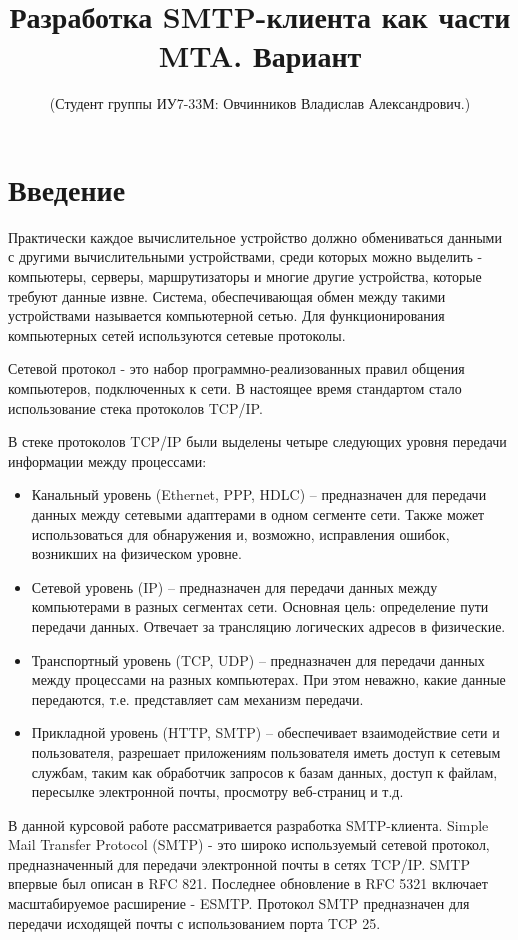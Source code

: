 \documentclass[a4paper,12pt]{report}
\title{Разработка SMTP-клиента как части MTA. Вариант \textnumero 26}
\author{(Студент группы ИУ7-33М: Овчинников Владислав Александрович.)}
\begin{document}
	\maketitle

	\tableofcontents

	\chapter*{Введение}
	Практически каждое вычислительное устройство должно обмениваться данными с другими вычислительными устройствами, среди которых можно выделить - компьютеры, серверы, маршрутизаторы и многие другие устройства, которые требуют данные извне. Система, обеспечивающая обмен между такими устройствами называется компьютерной сетью. Для функционирования компьютерных сетей используются сетевые протоколы.

	Сетевой протокол - это набор программно-реализованных правил общения компьютеров, подключенных к сети. В настоящее время стандартом стало использование стека протоколов TCP/IP.
	
	В стеке протоколов TCP/IP были выделены четыре следующих уровня передачи информации между процессами:
	
	\begin{itemize}
		\item Канальный уровень (Ethernet, PPP, HDLC) -- предназначен для передачи данных между сетевыми адаптерами в одном сегменте сети. Также может использоваться для обнаружения и, возможно, исправления ошибок, возникших на физическом уровне.
		\item Сетевой уровень (IP) -- предназначен для передачи данных между компьютерами в разных сегментах сети. Основная цель: определение пути передачи данных. Отвечает за трансляцию логических адресов в физические. 
		\item Транспортный уровень (TCP, UDP) -- предназначен для передачи данных между процессами на разных компьютерах. При этом неважно, какие данные передаются, т.е. представляет сам механизм передачи.
		\item Прикладной уровень (HTTP, SMTP) -- обеспечивает взаимодействие сети и пользователя, разрешает приложениям пользователя иметь доступ к сетевым службам, таким как обработчик запросов к базам данных, доступ к файлам, пересылке электронной почты, просмотру веб-страниц и т.д.
	\end{itemize}

	В данной курсовой работе рассматривается разработка SMTP-клиента. Simple Mail Transfer Protocol (SMTP) - это широко используемый сетевой протокол, предназначенный для передачи электронной почты в сетях TCP/IP. SMTP впервые был описан в RFC 821. Последнее обновление в RFC 5321 включает масштабируемое расширение - ESMTP. Протокол SMTP предназначен для передачи исходящей почты с использованием порта TCP 25.
\end{document}
